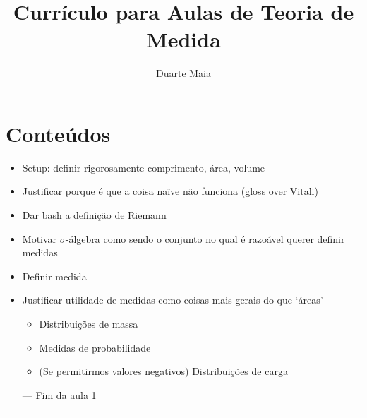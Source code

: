 \documentclass{article}
\title{Currículo para Aulas de Teoria de Medida}
\author{Duarte Maia}
\date{}
\begin{document}
\maketitle

\section{Conteúdos}

\begin{itemize}
\item Setup: definir rigorosamente comprimento, área, volume
\item Justificar porque é que a coisa naïve não funciona (gloss over Vitali)
\item Dar bash a definição de Riemann
\item Motivar $\sigma$-álgebra como sendo o conjunto no qual é razoável querer definir medidas
\item Definir medida
\item Justificar utilidade de medidas como coisas mais gerais do que `áreas'
\begin{itemize}
\item Distribuições de massa
\item Medidas de probabilidade
\item (Se permitirmos valores negativos) Distribuições de carga
\end{itemize}
\item[---] Fim da aula 1
\end{itemize}
\hrule
\end{document}
